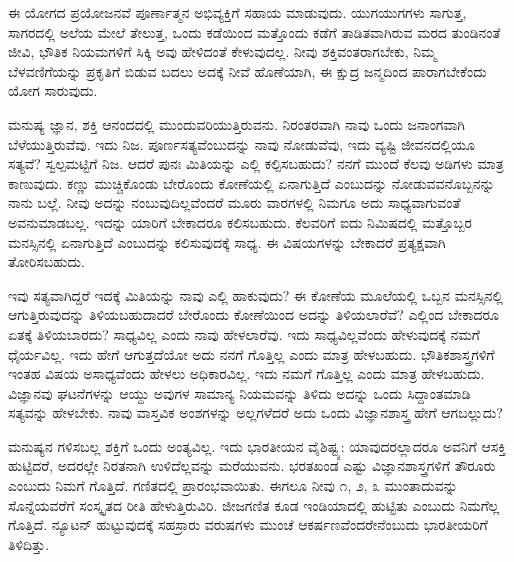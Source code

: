 \vskip 2pt

ಈ ಯೋಗದ ಪ್ರಯೋಜನವೆ ಪೂರ್ಣಾತ್ಮನ ಅಭಿವ್ಯಕ್ತಿಗೆ ಸಹಾಯ ಮಾಡುವುದು. ಯುಗಯುಗಗಳು ಸಾಗುತ್ತ, ಸಾಗರದಲ್ಲಿ ಅಲೆಯ ಮೇಲೆ ತೇಲುತ್ತ, ಒಂದು ಕಡೆಯಿಂದ ಮತ್ತೊಂದು ಕಡೆಗೆ ತಾಡಿತವಾಗಿರುವ ಮರದ ತುಂಡಿನಂತೆ ಜೀವಿ, ಭೌತಿಕ ನಿಯಮಗಳಿಗೆ ಸಿಕ್ಕಿ ಅವು ಹೇಳಿದಂತೆ ಕೇಳುವುದಲ್ಲ. ನೀವು ಶಕ್ತಿವಂತರಾಗಬೇಕು, ನಿಮ್ಮ ಬೆಳವಣಿಗೆಯನ್ನು ಪ್ರಕೃತಿಗೆ ಬಿಡುವ ಬದಲು ಅದಕ್ಕೆ ನೀವೆ ಹೊಣೆಯಾಗಿ, ಈ ಕ್ಷುದ್ರ ಜನ್ಮದಿಂದ ಪಾರಾಗಬೇಕೆಂದು ಯೋಗ ಸಾರುವುದು.

\vskip 2pt

ಮನುಷ್ಯ ಜ್ಞಾನ, ಶಕ್ತಿ ಆನಂದದಲ್ಲಿ ಮುಂದುವರಿಯುತ್ತಿರುವನು. ನಿರಂತರವಾಗಿ ನಾವು ಒಂದು ಜನಾಂಗವಾಗಿ ಬೆಳೆಯುತ್ತಿರುವೆವು. ಇದು ನಿಜ. ಪೂರ್ಣಸತ್ಯವೆಂಬುದನ್ನು ನಾವು ನೋಡುವೆವು, ಇದು ವ್ಯಷ್ಟಿ ಜೀವನದಲ್ಲಿಯೂ ಸತ್ಯವೆ? ಸ್ವಲ್ಪಮಟ್ಟಿಗೆ ನಿಜ. ಆದರೆ ಪುನಃ ಮಿತಿಯನ್ನು ಎಲ್ಲಿ ಕಲ್ಪಿಸಬಹುದು? ನನಗೆ ಮುಂದೆ ಕೆಲವು ಅಡಿಗಳು ಮಾತ್ರ ಕಾಣುವುದು. ಕಣ್ಣು ಮುಚ್ಚಿಕೊಂಡು ಬೇರೊಂದು ಕೋಣೆಯಲ್ಲಿ ಏನಾಗುತ್ತಿದೆ ಎಂಬುದನ್ನು ನೋಡುವವನೊಬ್ಬನನ್ನು ನಾನು ಬಲ್ಲೆ. ನೀವು ಅದನ್ನು ನಂಬುವುದಿಲ್ಲವೆಂದರೆ ಮೂರು ವಾರಗಳಲ್ಲಿ ನಿಮಗೂ ಅದು ಸಾಧ್ಯವಾಗುವಂತೆ ಅವನು\break ಮಾಡಬಲ್ಲ. ಇದನ್ನು ಯಾರಿಗೆ ಬೇಕಾದರೂ ಕಲಿಸಬಹುದು. ಕೆಲವರಿಗೆ ಐದು ನಿಮಿಷದಲ್ಲಿ ಮತ್ತೊಬ್ಬರ ಮನಸ್ಸಿನಲ್ಲಿ ಏನಾಗುತ್ತಿದೆ ಎಂಬುದನ್ನು ಕಲಿಸುವುದಕ್ಕೆ ಸಾಧ್ಯ. ಈ ವಿಷಯಗಳನ್ನು ಬೇಕಾದರೆ ಪ್ರತ್ಯಕ್ಷವಾಗಿ ತೋರಿಸಬಹುದು.

\newpage

ಇವು ಸತ್ಯವಾಗಿದ್ದರೆ ಇದಕ್ಕೆ ಮಿತಿಯನ್ನು ನಾವು ಎಲ್ಲಿ ಹಾಕುವುದು? ಈ ಕೋಣೆಯ ಮೂಲೆಯಲ್ಲಿ ಒಬ್ಬನ ಮನಸ್ಸಿನಲ್ಲಿ ಆಗುತ್ತಿರುವುದನ್ನು ತಿಳಿಯಬಹುದಾದರೆ ಬೇರೊಂದು ಕೋಣೆಯಿಂದ ಅದನ್ನು ತಿಳಿಯಲಾರೆವೆ? ಎಲ್ಲಿಂದ ಬೇಕಾದರೂ ಏತಕ್ಕೆ ತಿಳಿಯಬಾರದು? ಸಾಧ್ಯವಿಲ್ಲ ಎಂದು ನಾವು ಹೇಳಲಾರೆವು. ಇದು ಸಾಧ್ಯವಿಲ್ಲವೆಂದು ಹೇಳುವುದಕ್ಕೆ ನಮಗೆ ಧೈರ್ಯವಿಲ್ಲ. ಇದು ಹೇಗೆ ಆಗುತ್ತದೆಯೋ ಅದು ನನಗೆ ಗೊತ್ತಿಲ್ಲ ಎಂದು ಮಾತ್ರ ಹೇಳಬಹುದು. ಭೌತಿಕಶಾಸ್ತ್ರಗಳಿಗೆ ಇಂತಹ ವಿಷಯ ಅಸಾಧ್ಯವೆಂದು ಹೇಳಲು ಅಧಿಕಾರವಿಲ್ಲ. ಇದು ನಮಗೆ ಗೊತ್ತಿಲ್ಲ ಎಂದು ಮಾತ್ರ ಹೇಳಬಹುದು. ವಿಜ್ಞಾನವು ಘಟನೆಗಳನ್ನು ಆಯ್ದು ಅವುಗಳ ಸಾಮಾನ್ಯ ನಿಯಮವನ್ನು ತಿಳಿದು ಅದನ್ನು ಒಂದು ಸಿದ್ದಾಂತಮಾಡಿ ಸತ್ಯವನ್ನು ಹೇಳಬೇಕು. ನಾವು ವಾಸ್ತವಿಕ ಅಂಶಗಳನ್ನು ಅಲ್ಲಗಳೆದರೆ ಅದು ಒಂದು ವಿಜ್ಞಾನಶಾಸ್ತ್ರ ಹೇಗೆ ಆಗಬಲ್ಲುದು?

\vskip -2pt

ಮನುಷ್ಯನ ಗಳಿಸಬಲ್ಲ ಶಕ್ತಿಗೆ ಒಂದು ಅಂತ್ಯವಿಲ್ಲ. ಇದು ಭಾರತೀಯನ ವೈಶಿಷ್ಟ್ಯ: ಯಾವುದರಲ್ಲಾದರೂ ಅವನಿಗೆ ಆಸಕ್ತಿ ಹುಟ್ಟಿದರೆ, ಅದರಲ್ಲೇ ನಿರತನಾಗಿ ಉಳಿದೆಲ್ಲವನ್ನು ಮರೆಯುವನು. ಭರತಖಂಡ ಎಷ್ಟು ವಿಜ್ಞಾನಶಾಸ್ತ್ರಗಳಿಗೆ ತೌರೂರು ಎಂಬುದು ನಿಮಗೆ ಗೊತ್ತಿದೆ. ಗಣಿತದಲ್ಲಿ ಪ್ರಾರಂಭವಾಯಿತು. ಈಗಲೂ ನೀವು ೧, ೨, ೩ ಮುಂತಾದುವನ್ನು ಸೊನ್ನೆಯವರೆಗೆ ಸಂಸ್ಕೃತದ ರೀತಿ ಹೇಳುತ್ತಿರುವಿರಿ. ಜೀಜಗಣಿತ ಕೂಡ ಇಂಡಿಯಾದಲ್ಲಿ ಹುಟ್ಟಿತು ಎಂಬುದು ನಿಮಗೆಲ್ಲ ಗೊತ್ತಿದೆ. ನ್ಯೂಟನ್ ಹುಟ್ಟುವುದಕ್ಕೆ ಸಹಸ್ರಾರು ವರುಷಗಳು ಮುಂಚೆ ಆಕರ್ಷಣವೆಂದರೇನೆಂಬುದು ಭಾರತೀಯರಿಗೆ ತಿಳಿದಿತ್ತು.

